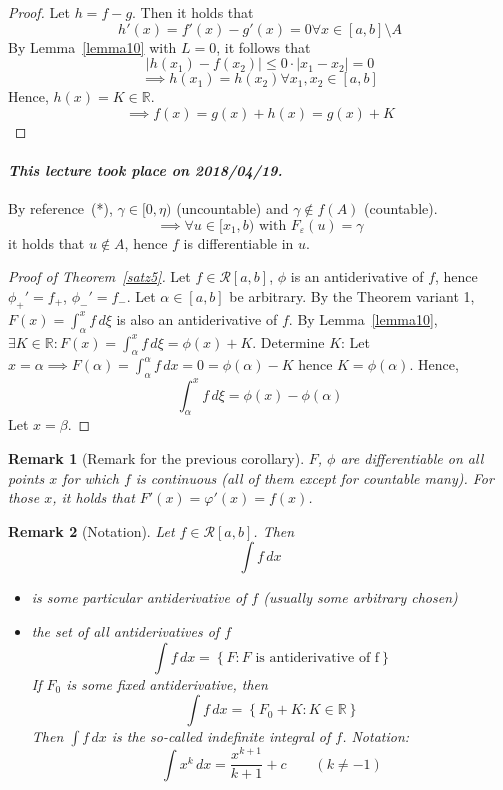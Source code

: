 \documentclass{article}
\newtheorem{remark}{Remark}  \numberwithin{remark}{section}
\newcommand{\set}[1]{\left\{#1\right\}}
\newcommand{\card}[1]{\left|#1\right|}
\newcommand{\dateref}[1]{\paragraph{\textit{This lecture took place on #1.}}}
\begin{document}
\begin{proof}
  Let $h = f - g$. Then it holds that
  \[ h'(x) = f'(x) - g'(x) = 0 \forall x \in [a,b] \setminus A \]
  By Lemma~\ref{lemma10} with $L = 0$, it follows that
  \[ \card{h(x_1) - f(x_2)} \leq 0 \cdot \card{x_1 - x_2} = 0 \]
  \[ \implies h(x_1) = h(x_2) \forall x_1, x_2 \in [a,b] \]
  Hence, $h(x) = K \in \mathbb R$.
  \[ \implies f(x) = g(x) + h(x) = g(x) + K \]
\end{proof}

\dateref{2018/04/19}

By reference~(*), $\gamma \in [0, \eta)$ (uncountable) and $\gamma \not\in f(A)$ (countable).
\[ \implies \forall u \in [x_1, b) \text{ with } F_{\varepsilon}(u) = \gamma \]
it holds that $u \not\in A$, hence $f$ is differentiable in $u$.

\begin{proof}[Proof of Theorem~\ref{satz5}]
  Let $f \in \mathcal R[a,b]$, $\phi$ is an antiderivative of $f$,
  hence $\phi_+' = f_+$, $\phi_-' = f_-$. Let $\alpha \in [a,b]$ be arbitrary.
  By the Theorem variant 1, $F(x) = \int_{\alpha}^x f \, d\xi$ is also an antiderivative of $f$.
  By Lemma~\ref{lemma10}, $\exists K \in \mathbb R: F(x) = \int_{\alpha}^x f \, d\xi = \phi(x) + K$.
  Determine $K$: Let $x = \alpha \implies F(\alpha) = \int_\alpha^\alpha f \, dx = 0 = \phi(\alpha) - K$
  hence $K = \phi(\alpha)$. Hence,
  \[ \int_\alpha^x f \, d\xi = \phi(x) - \phi(\alpha) \]
  Let $x = \beta$.
\end{proof}

\begin{remark}[Remark for the previous corollary]
  $F$, $\phi$ are differentiable on all points $x$ for which $f$ is continuous
  (all of them except for countable many).
  For those $x$, it holds that $F'(x) = \varphi'(x) = f(x)$.
\end{remark}

\begin{remark}[Notation]
  Let $f \in \mathcal R[a,b]$. Then
  \[ \int f \, dx \]
  \begin{itemize}
    \item is some particular antiderivative of $f$ (usually some arbitrary chosen)
    \item the set of \emph{all} antiderivatives of $f$
      \[ \int f \, dx = \set{F: F \text{ is antiderivative of f}} \]
      If $F_0$ is some fixed antiderivative, then
      \[ \int f \, dx = \set{F_0 + K: K \in \mathbb R} \]
      Then $\int f \, dx$ is the so-called \emph{indefinite integral of $f$}.
      Notation:
      \[ \int x^k \, dx = \frac{x^{k+1}}{k+1} + c \qquad (k \neq -1) \]
  \end{itemize}
\end{remark}
\end{document}
